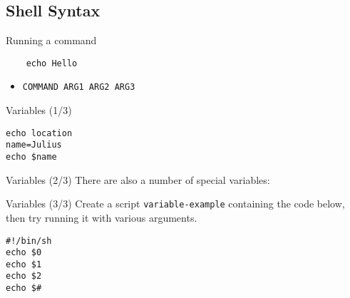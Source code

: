 \documentclass[12pt]{beamer}
\begin{document}
\subsection{Shell Syntax}
\begin{frame}[fragile]{Running a command}
  \begin{verbatim}
    echo Hello
  \end{verbatim}
  \begin{itemize}
    \item \texttt{COMMAND ARG1 ARG2 ARG3}
  \end{itemize}
\end{frame}

\begin{frame}[fragile]{Variables (1/3)}
  \begin{verbatim}
echo location
name=Julius
echo $name
\end{verbatim}
\end{frame}

\begin{frame}[fragile]{Variables (2/3)}
  There are also a number of special variables:
\end{frame}

\begin{frame}[fragile]{Variables (3/3)}
  Create a script \texttt{variable-example} containing the code below, then try running it with various arguments.
  \begin{verbatim}
#!/bin/sh
echo $0
echo $1
echo $2
echo $#
\end{verbatim}

\end{frame}
\end{document}
